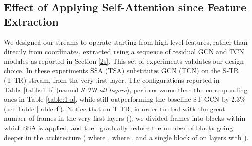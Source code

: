\documentclass[review]{cvpr}
\begin{document}
\subsection{Effect of Applying Self-Attention since Feature Extraction}
We designed our streams to operate starting from high-level features, rather than directly from coordinates, extracted using a sequence of residual GCN and TCN modules as reported in Section \ref{2s}. This set of experiments validates our design choice. In these experiments SSA (TSA) substitutes GCN (TCN) on the S-TR (T-TR) stream, from the very first layer. The configurations reported in Table~\ref{table:1-b} (named \textit{S-TR-all-layers}), perform worse than the corresponding ones in Table \ref{table:1-a}, while still outperforming the baseline ST-GCN \cite{dirgraph} by 2.3\% (see Table \ref{table:4}). Notice that on T-TR, in order to deal with the great number of frames in the very first layers (), we divided frames into blocks within which SSA is applied, and then gradually reduce the number of blocks going deeper in the architecture ( where ,  where , and a single block of  on layers  with ).
\end{document}

